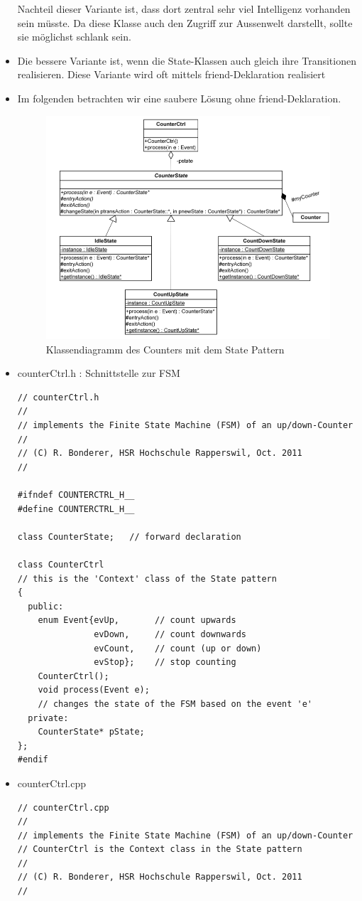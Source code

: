 \begin{itemize}
Nachteil dieser Variante ist, dass dort zentral sehr viel Intelligenz vorhanden
sein müsste. Da diese Klasse auch den Zugriff zur Aussenwelt darstellt, sollte
sie möglichst schlank sein.
\item Die bessere Variante ist, wenn die State-Klassen auch gleich ihre
Transitionen realisieren. Diese Variante wird oft mittels friend-Deklaration
realisiert
\item Im folgenden betrachten wir eine saubere Lösung ohne friend-Deklaration.
 \begin{figure}[h]
  \centering
  {\includegraphics[scale = 0.4]{images/FSM/klassendiagramm}  
  \caption{Klassendiagramm des Counters mit dem State Pattern}
  \label{fig:klassendiagramm}}
\end{figure}
\item counterCtrl.h : Schnittstelle zur FSM
\begin{lstlisting}
// counterCtrl.h
//
// implements the Finite State Machine (FSM) of an up/down-Counter
//
// (C) R. Bonderer, HSR Hochschule Rapperswil, Oct. 2011
//

#ifndef COUNTERCTRL_H__
#define COUNTERCTRL_H__

class CounterState;   // forward declaration

class CounterCtrl
// this is the 'Context' class of the State pattern
{
  public:
    enum Event{evUp,       // count upwards
               evDown,     // count downwards
               evCount,    // count (up or down)
               evStop};    // stop counting
    CounterCtrl();
    void process(Event e);  
    // changes the state of the FSM based on the event 'e'
  private:
    CounterState* pState;
};
#endif
\end{lstlisting}
\item counterCtrl.cpp
\begin{lstlisting}
// counterCtrl.cpp
//
// implements the Finite State Machine (FSM) of an up/down-Counter
// CounterCtrl is the Context class in the State pattern
//
// (C) R. Bonderer, HSR Hochschule Rapperswil, Oct. 2011
//


\end{lstlisting}
\end{itemize}
